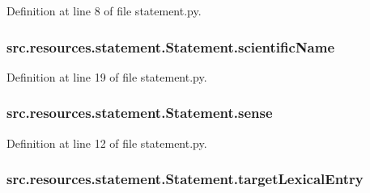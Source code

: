 Definition at line 8 of file statement.\+py.

\hypertarget{classsrc_1_1resources_1_1statement_1_1_statement_a4ca0fc81e7e5e019137c08904ad0c42a}{
\subsubsection[{scientific\+Name}]{\setlength{\rightskip}{0pt plus 5cm}src.\+resources.\+statement.\+Statement.\+scientific\+Name}}\label{classsrc_1_1resources_1_1statement_1_1_statement_a4ca0fc81e7e5e019137c08904ad0c42a}


Definition at line 19 of file statement.\+py.

\hypertarget{classsrc_1_1resources_1_1statement_1_1_statement_ac3f2abe2f05fde8310b81312c85042b3}{
\subsubsection[{sense}]{\setlength{\rightskip}{0pt plus 5cm}src.\+resources.\+statement.\+Statement.\+sense}}\label{classsrc_1_1resources_1_1statement_1_1_statement_ac3f2abe2f05fde8310b81312c85042b3}


Definition at line 12 of file statement.\+py.

\hypertarget{classsrc_1_1resources_1_1statement_1_1_statement_a6ff34173dbdc734d3994fadd46e6e229}{
\subsubsection[{target\+Lexical\+Entry}]{\setlength{\rightskip}{0pt plus 5cm}src.\+resources.\+statement.\+Statement.\+target\+Lexical\+Entry}}\label{classsrc_1_1resources_1_1statement_1_1_statement_a6ff34173dbdc734d3994fadd46e6e229}



